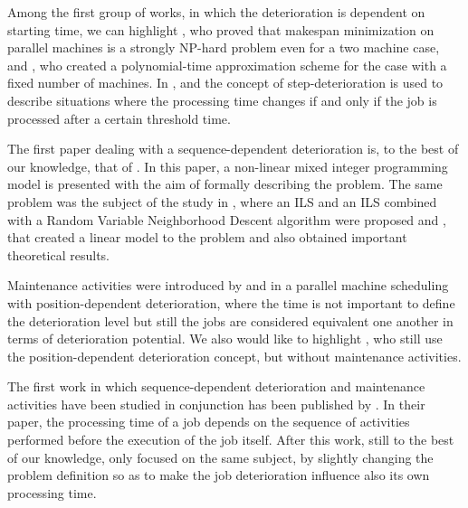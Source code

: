 \documentclass[a4paper,11pt]{article}
\begin{document}
Among the first group of works, in which the deterioration is dependent on starting time, we can highlight \cite{Mosheiov1998}, who proved that makespan minimization on parallel machines is a strongly NP-hard problem even for a two machine case, and \cite{JI2008342}, who created a polynomial-time approximation scheme for the case with a fixed number of machines. In \cite{cheng2001single}, \cite{leung2008minimizing} and \cite{lalla2016modeling} the concept of step-deterioration is used to describe situations where the processing time changes if and only if the job is processed after a certain threshold time. 
 
 The first paper dealing with a sequence-dependent deterioration is, to the best of our knowledge, that of \cite{RUIZTORRES20132051}. In this paper, a non-linear mixed integer programming model is presented with the aim of formally describing the problem. The same problem was the subject of the study in \cite{SantosArroyo2015}, where an ILS and an ILS combined with a Random Variable Neighborhood Descent algorithm were proposed and  \cite{deminimizing}, that created a linear model to the problem and also obtained important theoretical results. 
 
Maintenance activities were introduced by \cite{Yang2011} and \cite{YANG20121458} in a parallel machine scheduling with position-dependent deterioration, where the time is not important to define the deterioration level but still the jobs are considered equivalent one another in terms of deterioration potential. We also would like to highlight \cite{HUANG20152897}, who still use the position-dependent deterioration concept, but without maintenance activities.
 
The first work in which sequence-dependent deterioration and maintenance activities have been studied in conjunction has been published by \cite{ruiz2017makespan}. In their paper, the processing time of a job depends on the sequence of activities performed before the execution of the job itself. After this work, still to the best of our knowledge, only \cite{DING201935} focused on the same subject, by slightly changing the problem definition so as to make the job deterioration influence also its own processing time. 
 
\end{document}

